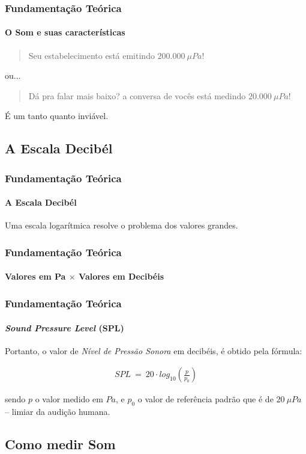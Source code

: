 \documentclass[brazil]{beamer}
\begin{document}
	\begin{frame}
		\frametitle{Fundamentação Teórica}
		\framesubtitle{O Som e suas características}
		\begin{quote}
			Seu estabelecimento está emitindo $200.000 \ \mu Pa$!
		\end{quote}
		ou...
		\begin{quote}
			Dá pra falar mais baixo? a conversa de vocês está medindo $20.000 \ \mu Pa$!
		\end{quote}
		É um tanto quanto inviável.
	\end{frame}	

	\subsection{A Escala Decibél}

	\begin{frame}
		\frametitle{Fundamentação Teórica}
		\framesubtitle{A Escala Decibél}
		Uma escala logarítmica resolve o problema dos valores grandes.
	\end{frame}

	\begin{frame}
		\frametitle{Fundamentação Teórica}
		\framesubtitle{Valores em Pa $\times$ Valores em Decibéis}
	\end{frame}

	\begin{frame}
		\frametitle{Fundamentação Teórica}
		\framesubtitle{{\it Sound Pressure Level} (SPL)}
		Portanto, o valor de \textit{Nível de Pressão Sonora} em decibéis, é obtido pela fórmula:

		\begin{align}\label{eq-dec}
		  SPL \ = \ 20\cdot log_{10} \left(\frac{p}{p_0}\right)
		\end{align}

		sendo $p$ o valor medido em $Pa$, e $p_0$ o valor de referência padrão que é de $20 \ \mu Pa$ -- limiar da audição humana. 
	\end{frame}

	\subsection{Como medir Som}
\end{document}
